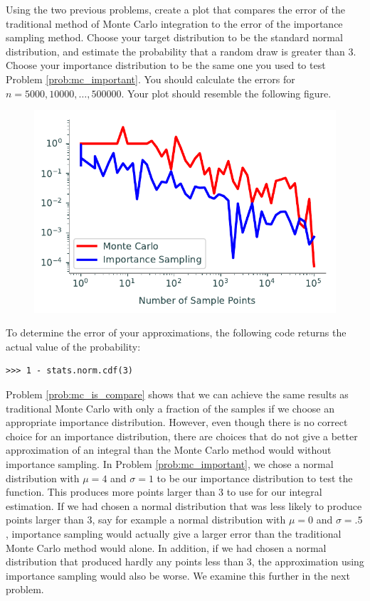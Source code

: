 \begin{problem} \label{prob:mc_is_compare}
Using the two previous problems, create a plot that compares the error of the traditional method of Monte Carlo integration to the error of the importance sampling method.
Choose your target distribution to be the standard normal distribution, and estimate the probability that a random draw is greater than $3$.
Choose your importance distribution to be the same one you used to test Problem \ref{prob:mc_important}.
You should calculate the errors for $n = 5000, 10000, \ldots , 500000$.
Your plot should resemble the following figure.

\begin{figure}[H]
\includegraphics[width=.7\textwidth]{figures/MCvsIS.pdf}
\label{fig:compare}
\end{figure}

To determine the error of your approximations, the following code returns the actual value of the probability:
\begin{lstlisting}
>>> 1 - stats.norm.cdf(3)
\end{lstlisting}
\end{problem}

Problem \ref{prob:mc_is_compare} shows that we can achieve the same results as traditional Monte Carlo with only a fraction of the samples if we choose an appropriate importance distribution.
However, even though there is no correct choice for an importance distribution, there are choices that do not give a better approximation of an integral than the Monte Carlo method would without importance sampling.
In Problem \ref{prob:mc_important}, we chose a normal distribution with $\mu = 4$ and $\sigma = 1$ to be our importance distribution to test the function.
This produces more points larger than $3$ to use for our integral estimation.
If we had chosen a normal distribution that was less likely to produce points larger than $3$, say for example a normal distribution with $\mu = 0$ and $\sigma = .5$, importance sampling would actually give a larger error than the traditional Monte Carlo method would alone.
In addition, if we had chosen a normal distribution that produced hardly any points less than $3$, the approximation using importance sampling would also be worse.
We examine this further in the next problem.

